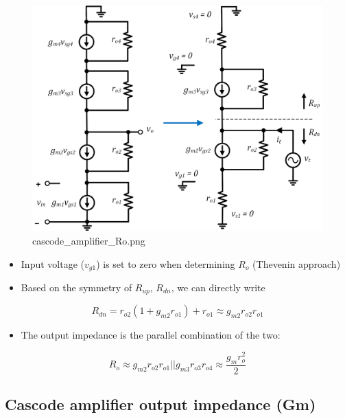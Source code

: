 \documentclass[11pt]{article}
\providecommand{\tightlist}{%
      \setlength{\itemsep}{0pt}\setlength{\parskip}{0pt}}
\begin{document}
    \begin{figure}
\centering
\includegraphics{cascode_amplifier_Ro.png}
\caption{cascode\_amplifier\_Ro.png}
\end{figure}

    \begin{itemize}
\tightlist
\item
  Input voltage (\(v_{g1}\)) is set to zero when determining \(R_o\)
  (Thevenin approach)
\item
  Based on the symmetry of \(R_{up}\), \(R_{dn}\), we can directly write
\end{itemize}

\begin{equation}
R_{dn} = r_{o2}(1+g_{m2} r_{o1}) + r_{o1} \approx g_{m2}r_{o2}r_{o1}
\end{equation}

\begin{itemize}
\tightlist
\item
  The output impedance is the parallel combination of the two:
\end{itemize}

\begin{equation}
R_{o} \approx g_{m2}r_{o2}r_{o1}||g_{m3}r_{o3}r_{o4} \approx \dfrac{g_mr_o^2}{2}
\end{equation}

    \hypertarget{cascode-amplifier-output-impedance-gm}{%
\subsection{Cascode amplifier output impedance
(Gm)}\label{cascode-amplifier-output-impedance-gm}}
\end{document}
